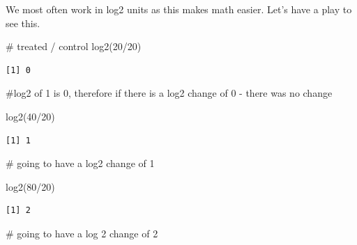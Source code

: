\documentclass[
  letterpaper,
  DIV=11,
  numbers=noendperiod]{scrartcl}
\newenvironment{Shaded}{\begin{snugshade}}{\end{snugshade}}
\newcommand{\CommentTok}[1]{\textcolor[rgb]{0.37,0.37,0.37}{#1}}
\newcommand{\DecValTok}[1]{\textcolor[rgb]{0.68,0.00,0.00}{#1}}
\newcommand{\FunctionTok}[1]{\textcolor[rgb]{0.28,0.35,0.67}{#1}}
\newcommand{\NormalTok}[1]{\textcolor[rgb]{0.00,0.23,0.31}{#1}}
\newcommand{\SpecialCharTok}[1]{\textcolor[rgb]{0.37,0.37,0.37}{#1}}
\begin{document}
We most often work in log2 units as this makes math easier. Let's have a
play to see this.

\begin{Shaded}
\begin{Highlighting}[]
\CommentTok{\# treated / control}
\FunctionTok{log2}\NormalTok{(}\DecValTok{20}\SpecialCharTok{/}\DecValTok{20}\NormalTok{)}
\end{Highlighting}
\end{Shaded}

\begin{verbatim}
[1] 0
\end{verbatim}

\begin{Shaded}
\begin{Highlighting}[]
\CommentTok{\#log2 of 1 is 0, therefore if there is a log2 change of 0 {-} there was no change }
\end{Highlighting}
\end{Shaded}

\begin{Shaded}
\begin{Highlighting}[]
\FunctionTok{log2}\NormalTok{(}\DecValTok{40}\SpecialCharTok{/}\DecValTok{20}\NormalTok{)}
\end{Highlighting}
\end{Shaded}

\begin{verbatim}
[1] 1
\end{verbatim}

\begin{Shaded}
\begin{Highlighting}[]
\CommentTok{\# going to have a log2 change of 1 }
\end{Highlighting}
\end{Shaded}

\begin{Shaded}
\begin{Highlighting}[]
\FunctionTok{log2}\NormalTok{(}\DecValTok{80}\SpecialCharTok{/}\DecValTok{20}\NormalTok{)}
\end{Highlighting}
\end{Shaded}

\begin{verbatim}
[1] 2
\end{verbatim}

\begin{Shaded}
\begin{Highlighting}[]
\CommentTok{\# going to have a log 2 change of 2 }
\end{Highlighting}
\end{Shaded}
\end{document}
